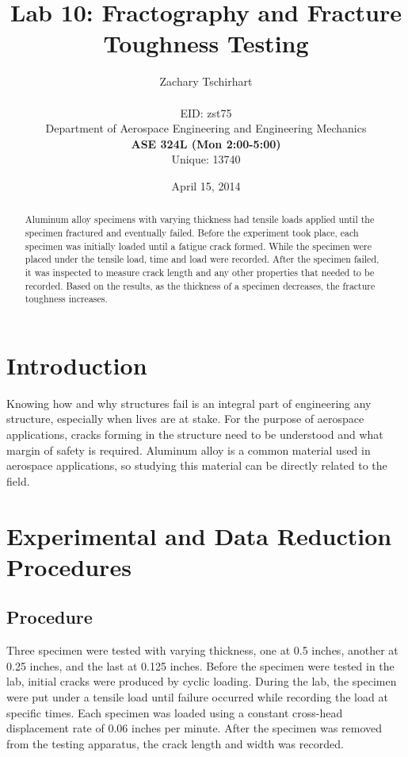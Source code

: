 \documentclass[12pt]{report}
\title{Lab 10: Fractography and Fracture Toughness Testing}
\author{Zachary Tschirhart \\
	\small \\
        \small EID: zst75 \\
	\small Department of Aerospace Engineering and Engineering Mechanics \\
	\small \textbf{ASE 324L (Mon 2:00-5:00)} \\
	\small Unique: 13740}
\date{April 15, 2014}
\begin{document}
\maketitle

\begin{abstract}
Aluminum alloy specimens with varying thickness had tensile loads applied until the specimen fractured and eventually failed. Before the experiment took place, each specimen was initially loaded until a fatigue crack formed. While the specimen were placed under the tensile load, time and load were recorded. After the specimen failed, it was inspected to measure crack length and any other properties that needed to be recorded. Based on the results, as the thickness of a specimen decreases, the fracture toughness increases.

\end{abstract}


\tableofcontents
\pagebreak

\setcounter{secnumdepth}{0}

\section{Introduction}
\doublespacing
Knowing how and why structures fail is an integral part of engineering any structure, especially when lives are at stake. For the purpose of aerospace applications, cracks forming in the structure need to be understood and what margin of safety is required. Aluminum alloy is a common material used in aerospace applications, so studying this material can be directly related to the field. 

\section{Experimental and Data Reduction Procedures}
\subsection{Procedure}
Three specimen were tested with varying thickness, one at 0.5 inches, another at 0.25 inches, and the last at 0.125 inches. Before the specimen were tested in the lab, initial cracks were produced by cyclic loading. During the lab, the specimen were put under a tensile load until failure occurred while recording the load at specific times. Each specimen was loaded using a constant cross-head displacement rate of 0.06 inches per minute. After the specimen was removed from the testing apparatus, the crack length and width was recorded.
\end{document}
